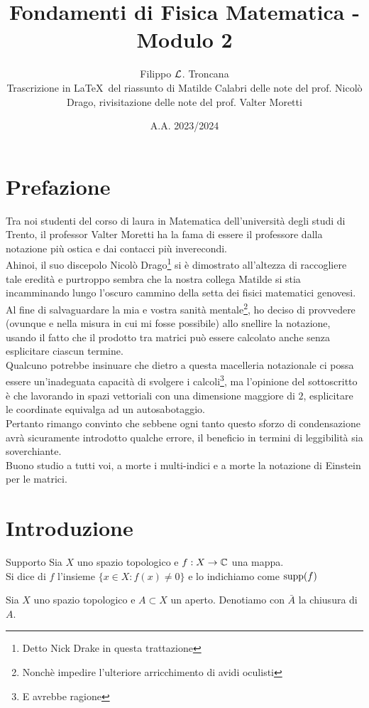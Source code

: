 \documentclass{book}
\title{Fondamenti di Fisica Matematica - Modulo 2}
\author{Filippo $\mathcal{L}$. Troncana \\ \footnotesize Trascrizione in \LaTeX\ del riassunto di Matilde Calabri delle note del prof. Nicolò Drago, rivisitazione delle note del prof. Valter Moretti}
\date{A.A. 2023/2024}
\begin{document}
\maketitle


\section*{Prefazione}
    
Tra noi studenti del corso di laura in Matematica dell'università degli studi di Trento, il professor Valter Moretti ha la fama di essere il professore dalla notazione più ostica e dai contacci più inverecondi.\\
Ahinoi, il suo discepolo Nicolò Drago\footnote{Detto Nick Drake in questa trattazione} si è dimostrato all'altezza di raccogliere tale eredità e purtroppo sembra che la nostra collega Matilde si stia incamminando lungo l'oscuro cammino della setta dei fisici matematici genovesi.\\
Al fine di salvaguardare la mia e vostra sanità mentale\footnote{Nonchè impedire l'ulteriore arricchimento di avidi oculisti}, ho deciso di provvedere (ovunque e nella misura in cui mi fosse possibile) allo snellire la notazione, usando il  fatto che il prodotto tra matrici può essere calcolato anche senza esplicitare ciascun termine.\\
Qualcuno potrebbe insinuare che dietro a questa macelleria notazionale ci possa essere un'inadeguata capacità di svolgere i calcoli\footnote{E avrebbe ragione}, ma l'opinione del sottoscritto è che lavorando in spazi vettoriali con una dimensione maggiore di $2$, esplicitare le coordinate equivalga ad un autosabotaggio.\\
Pertanto rimango convinto che sebbene ogni tanto questo sforzo di condensazione avrà sicuramente introdotto qualche errore, il beneficio in termini di leggibilità sia soverchiante.\\
Buono studio a tutti voi, a morte i multi-indici e a morte la notazione di Einstein per le matrici.

\tableofcontents

\section{Introduzione}

\begin{definition}{Supporto}{}
    Sia $X$ uno spazio topologico e $f:X\to\mathbb{C}$ una mappa.\\
    Si dice  di $f$ l'insieme $\{x\in X : f(x)\neq 0\}$ e lo indichiamo come $\operatorname{supp}(f)$
\end{definition}
\begin{notation}
    Sia $X$ uno spazio topologico e $A\subset X$ un aperto. Denotiamo con $\bar{A}$ la chiusura di $A$.
\end{notation}
\end{document}
